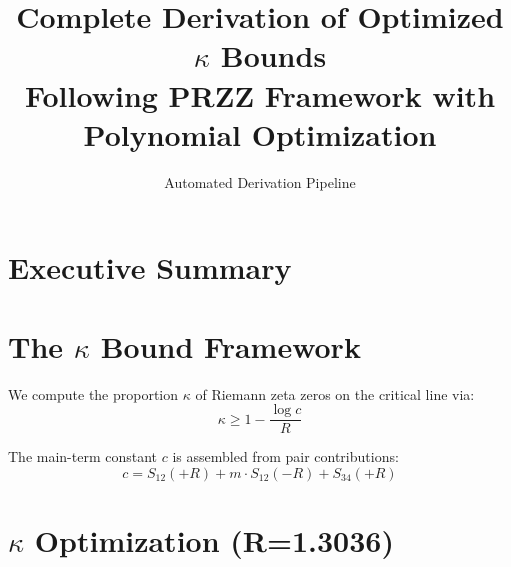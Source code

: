 \documentclass[11pt]{article}
\title{Complete Derivation of Optimized $\kappa$ Bounds\\
\large Following PRZZ Framework with Polynomial Optimization}
\author{Automated Derivation Pipeline}
\date{}
\begin{document}
\maketitle

\section{Executive Summary}

\begin{center}
\end{center}

\section{The $\kappa$ Bound Framework}

We compute the proportion $\kappa$ of Riemann zeta zeros on the critical line via:
\begin{equation}
\boxed{\kappa \geq 1 - \frac{\log c}{R}}
\end{equation}

The main-term constant $c$ is assembled from pair contributions:
\begin{equation}
c = S_{12}(+R) + m \cdot S_{12}(-R) + S_{34}(+R)
\end{equation}

\section{$\kappa$ Optimization (R=1.3036)}
\end{document}
